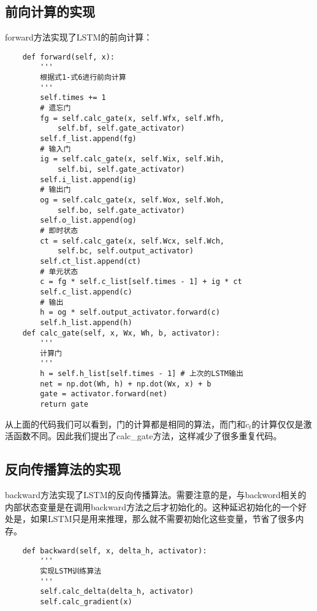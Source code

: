 \subsection{前向计算的实现}\label{Lstm:12}

forward方法实现了LSTM的前向计算：
\begin{lstlisting}
    def forward(self, x):
        '''
        根据式1-式6进行前向计算
        '''
        self.times += 1
        # 遗忘门
        fg = self.calc_gate(x, self.Wfx, self.Wfh, 
            self.bf, self.gate_activator)
        self.f_list.append(fg)
        # 输入门
        ig = self.calc_gate(x, self.Wix, self.Wih,
            self.bi, self.gate_activator)
        self.i_list.append(ig)
        # 输出门
        og = self.calc_gate(x, self.Wox, self.Woh,
            self.bo, self.gate_activator)
        self.o_list.append(og)
        # 即时状态
        ct = self.calc_gate(x, self.Wcx, self.Wch,
            self.bc, self.output_activator)
        self.ct_list.append(ct)
        # 单元状态
        c = fg * self.c_list[self.times - 1] + ig * ct
        self.c_list.append(c)
        # 输出
        h = og * self.output_activator.forward(c)
        self.h_list.append(h)
    def calc_gate(self, x, Wx, Wh, b, activator):
        '''
        计算门
        '''
        h = self.h_list[self.times - 1] # 上次的LSTM输出
        net = np.dot(Wh, h) + np.dot(Wx, x) + b
        gate = activator.forward(net)
        return gate
\end{lstlisting}

从上面的代码我们可以看到，门的计算都是相同的算法，而门和\({\tilde{c}_t}\)的计算仅仅是激活函数不同。因此我们提出了calc\_gate方法，这样减少了很多重复代码。


\subsection{反向传播算法的实现}\label{Lstm:13}

backward方法实现了LSTM的反向传播算法。需要注意的是，与backword相关的内部状态变量是在调用backward方法之后才初始化的。这种延迟初始化的一个好处是，如果LSTM只是用来推理，那么就不需要初始化这些变量，节省了很多内存。
\begin{lstlisting}
    def backward(self, x, delta_h, activator):
        '''
        实现LSTM训练算法
        '''
        self.calc_delta(delta_h, activator)
        self.calc_gradient(x)
\end{lstlisting}

